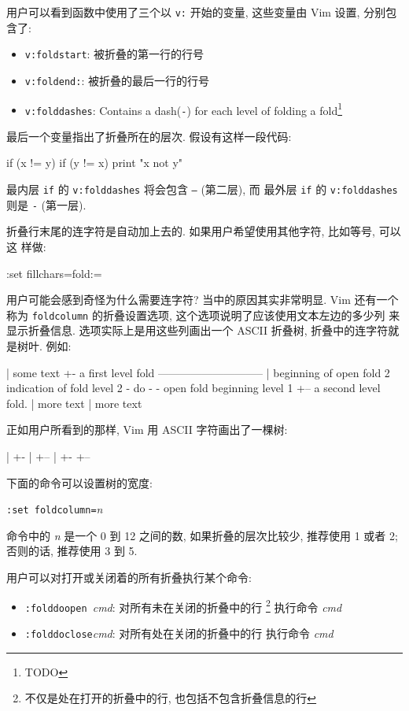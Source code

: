 用户可以看到函数中使用了三个以 \texttt{v:} 开始的变量, 这些变量由 Vim 设置,
分别包含了:
\begin{itemize}
    \item \texttt{v:foldstart}: 被折叠的第一行的行号
    \item \texttt{v:foldend:}: 被折叠的最后一行的行号
    \item \texttt{v:folddashes}: Contains a dash(\texttt{-}) for each level of
        folding a fold\footnote{TODO}
\end{itemize}

最后一个变量指出了折叠所在的层次. 假设有这样一段代码:
\begin{vimcode}
if (x != y) {
    if (y != x) {
        print "x not y"
    }
}
\end{vimcode}
最内层 \texttt{if} 的 \texttt{v:folddashes} 将会包含 \texttt{--} (第二层), 而
最外层 \texttt{if} 的 \texttt{v:folddashes} 则是 \texttt{-} (第一层).

折叠行末尾的连字符是自动加上去的. 如果用户希望使用其他字符, 比如等号, 可以这
样做:
\begin{vimcode}
:set fillchars=fold:=
\end{vimcode}

用户可能会感到奇怪为什么需要连字符? 当中的原因其实非常明显. Vim 还有一个称为
\texttt{foldcolumn} 的折叠设置选项, 这个选项说明了应该使用文本左边的多少列
来显示折叠信息. 选项实际上是用这些列画出一个 ASCII 折叠树, 折叠中的连字符就
是树叶. 例如:
\begin{vimcode}
| some text
+- a first level fold -----------------------------
|
    beginning of open fold
2   indication of fold level
2     - do -
- open fold beginning level 1
+-- a second level fold.
| more text
| more text
\end{vimcode}

正如用户所看到的那样, Vim 用 ASCII 字符画出了一棵树:
\begin{vimcode}
|
+-
|
+--
|
+-
+--
\end{vimcode}
下面的命令可以设置树的宽度:
\begin{vimcmdform}
\texttt{:set foldcolumn=}\textit{n}
\end{vimcmdform}
命令中的 \textit{n} 是一个 0 到 12 之间的数, 如果折叠的层次比较少, 推荐使用 1
或者 2; 否则的话, 推荐使用 3 到 5.

\begin{warning}
    用户可以对打开或关闭着的所有折叠执行某个命令:
    \begin{itemize}
        \item \texttt{:folddoopen }\textit{cmd}: 对所有未在关闭的折叠中的行
            \footnote{不仅是处在打开的折叠中的行, 也包括不包含折叠信息的行}
            执行命令 \textit{cmd}
        \item \texttt{:folddoclose}\textit{cmd}: 对所有处在关闭的折叠中的行
            执行命令 \textit{cmd}
    \end{itemize}
\end{warning}

